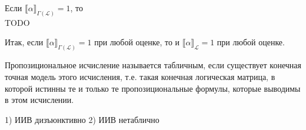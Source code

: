 \begin{lemma}
Если ${\llbracket \alpha \rrbracket}_{\Gamma(\mathcal{L})} = 1$, то
\\TODO
\end{lemma}

Итак, если ${\llbracket \alpha \rrbracket}_{\Gamma(\mathcal{L})} = 1$ при любой оценке,
то и ${\llbracket \alpha \rrbracket}_{\mathcal{L}} = 1$ при любой оценке.

\begin{definition}
Пропозициональное исчисление называется табличным, если существует конечная точная модель этого исчисления, т.е.
такая конечная логическая матрица, в которой истинны те и
только те пропозициональные формулы, которые выводимы в
этом исчислении.
\end{definition}

1) ИИВ дизъюнктивно
2) ИИВ нетаблично